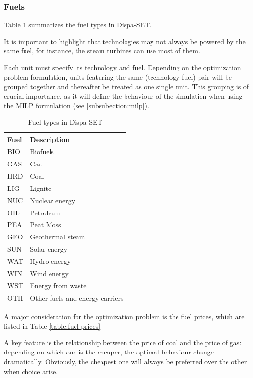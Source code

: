 \subsubsection{Fuels}

Table \ref{table:fuels-eu} summarizes the fuel types in Dispa-SET.

It is important to highlight that technologies may not always be powered by the same fuel, for instance, the steam turbines can use most of them.

Each unit must specify its technology and fuel. Depending on the optimization problem formulation, units featuring the same (technology-fuel) pair will be grouped together and thereafter be treated as one single unit. This grouping is of crucial importance, as it will define the behaviour of the simulation when using the MILP formulation (see \ref{subsubection:milp}).

\begin{table}[h]
    \centering
	\begin{tabular}{|l l|}
		\hline
		Fuel & Description\\
		\hline
		BIO & Biofuels\\
		GAS & Gas\\
		HRD & Coal\\
		LIG & Lignite \\
		NUC & Nuclear energy\\
		OIL & Petroleum\\
		PEA & Peat Moss\\
		GEO & Geothermal steam \\
		SUN & Solar energy\\
		WAT & Hydro energy\\
		WIN & Wind energy\\
		WST & Energy from waste\\
		OTH & Other fuels and energy carriers\\
		\hline
	\end{tabular}
	\caption{Fuel types in Dispa-SET}
	\label{table:fuels-eu}
\end{table}

A major consideration for the optimization problem is the fuel prices, which are listed in Table \ref{table:fuel-prices}.

A key feature is the relationship between the price of coal and the price of gas: depending on which one is the cheaper, the optimal behaviour change dramatically. Obviously, the cheapest one will always be preferred over the other when choice arise. 

